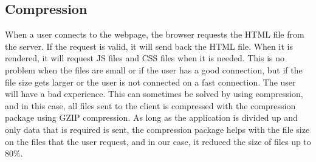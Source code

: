 \subsection{Compression}
When a user connects to the webpage, the browser requests the HTML file from the server. If the request is valid, it will send back the HTML file. When it is rendered, it will request JS files and CSS files when it is needed. This is no problem when the files are small or if the user has a good connection, but if the file size gets larger or the user is not connected on a fast connection. The user will have a bad experience. This can sometimes be solved by using compression, and in this case, all files sent to the client is compressed with the compression package\cite{Compression:Info} using GZIP compression.\cite{GZIP:Info} As long as the application is divided up and only data that is required is sent, the compression package helps with the file size on the files that the user request, and in our case, it reduced the size of files up to 80\%.